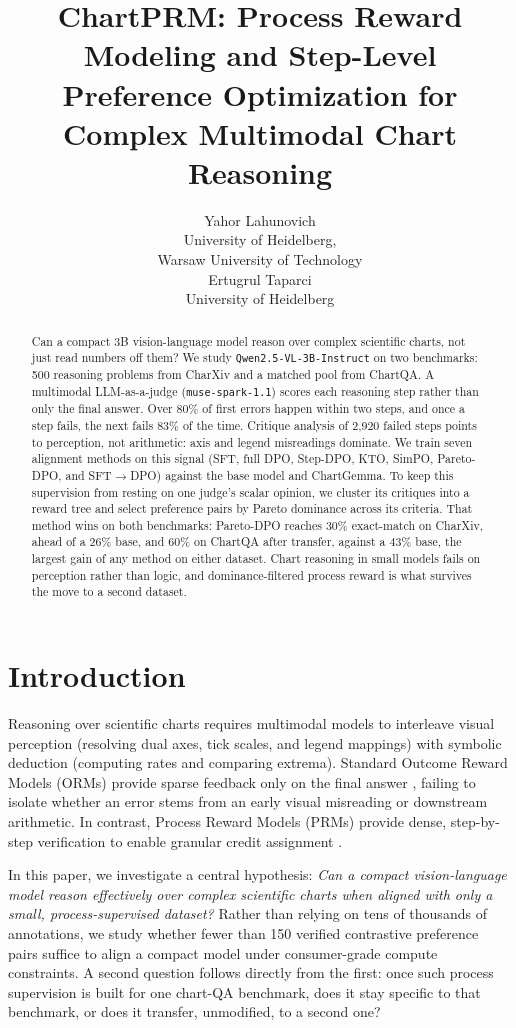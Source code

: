 \documentclass[11pt]{article}
\title{ChartPRM: Process Reward Modeling and Step-Level Preference Optimization for Complex Multimodal Chart Reasoning}
\author{
  Yahor Lahunovich \\
  University of Heidelberg, \\
  Warsaw University of Technology \\\And
  Ertugrul Taparci \\
  University of Heidelberg \\
}
\begin{document}
\maketitle

\begin{abstract}
Can a compact 3B vision-language model reason over complex scientific charts, not just read numbers off them? We study \texttt{Qwen2.5-VL-3B-Instruct} on two benchmarks: 500 reasoning problems from CharXiv and a matched pool from ChartQA. A multimodal LLM-as-a-judge (\texttt{muse-spark-1.1}) scores each reasoning step rather than only the final answer. Over 80\% of first errors happen within two steps, and once a step fails, the next fails 83\% of the time. Critique analysis of 2,920 failed steps points to perception, not arithmetic: axis and legend misreadings dominate. We train seven alignment methods on this signal (SFT, full DPO, Step-DPO, KTO, SimPO, Pareto-DPO, and SFT$\rightarrow$DPO) against the base model and ChartGemma. To keep this supervision from resting on one judge's scalar opinion, we cluster its critiques into a reward tree and select preference pairs by Pareto dominance across its criteria. That method wins on both benchmarks: Pareto-DPO reaches 30\% exact-match on CharXiv, ahead of a 26\% base, and 60\% on ChartQA after transfer, against a 43\% base, the largest gain of any method on either dataset. Chart reasoning in small models fails on perception rather than logic, and dominance-filtered process reward is what survives the move to a second dataset.
\end{abstract}

\section{Introduction}
\label{sec:introduction}

Reasoning over scientific charts requires multimodal models to interleave visual perception (resolving dual axes, tick scales, and legend mappings) with symbolic deduction (computing rates and comparing extrema). Standard Outcome Reward Models (ORMs) provide sparse feedback only on the final answer \citep{ouyang2022instructgpt}, failing to isolate whether an error stems from an early visual misreading or downstream arithmetic. In contrast, Process Reward Models (PRMs) provide dense, step-by-step verification to enable granular credit assignment \citep{lightman2023prm}.

In this paper, we investigate a central hypothesis: \textit{Can a compact vision-language model reason effectively over complex scientific charts when aligned with only a small, process-supervised dataset?} Rather than relying on tens of thousands of annotations, we study whether fewer than 150 verified contrastive preference pairs suffice to align a compact model under consumer-grade compute constraints. A second question follows directly from the first: once such process supervision is built for one chart-QA benchmark, does it stay specific to that benchmark, or does it transfer, unmodified, to a second one?
\end{document}
